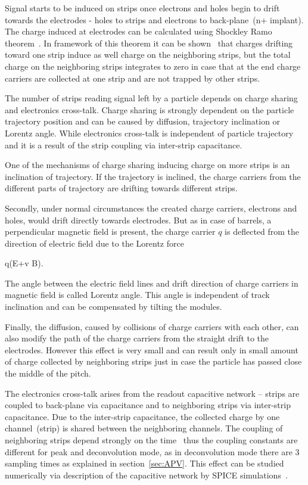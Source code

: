Signal starts to be induced on strips once electrons and holes begin to drift towards the electrodes - holes to strips and electrons to back-plane~(n+ implant). The charge induced at electrodes can be calculated using Shockley Ramo theorem~\cite{doi:10.1063/1.1710367,Ramo:1939vr}. In framework of this theorem it can be shown~\cite{Bloch:2007zza} that charges drifting toward one strip induce as well charge on the neighboring strips, but the total charge on the neighboring strips integrates to zero in case that at the end charge carriers are collected at one strip and are not trapped by other strips.

The number of strips reading signal left by a particle depends on charge sharing and electronics cross-talk. Charge sharing is strongly dependent on the particle trajectory position and can be caused by diffusion, trajectory inclination or Lorentz angle. While electronics cross-talk is independent of particle trajectory and it is a result of the strip coupling via inter-strip capacitance. 

One of the mechanisms of charge sharing inducing charge on more strips is an inclination of trajectory. If the trajectory is inclined, the charge carriers from the different parts of trajectory are drifting towards different strips.

Secondly, under normal circumstances the created charge carriers, electrons and holes, would drift directly towards electrodes. But as in case of barrels, a perpendicular magnetic field is present, the charge carrier $q$ is deflected from the direction of electric field due to the Lorentz force

{
    q(E+v \times B).
}

The angle between the electric field lines and drift direction of charge carriers in magnetic field is called Lorentz angle. This angle is independent of track inclination and can be compensated by tilting the modules.

Finally, the diffusion, caused by collisions of charge carriers with each other, can also modify the path of the charge carriers from the straight drift to the electrodes. However this effect is very small and can result only in small amount of charge collected by neighboring strips just in case the particle has passed close the middle of the pitch.


The electronics cross-talk arises from the readout capacitive network -- strips are coupled to back-plane via capacitance and to neighboring strips via inter-strip capacitance. Due to the inter-strip capacitance, the collected charge by one channel~(strip) is shared between the neighboring channels. The coupling of neighboring strips depend strongly on the time~\cite{Bloch:2007zza} thus the coupling constants are different for peak and deconvolution mode, as in deconvolution mode there are 3 sampling times as explained in section~\ref{sec:APV}. This effect can be studied numerically via description of the capacitive network by SPICE simulations~\cite{Barberis:1993ph}.


